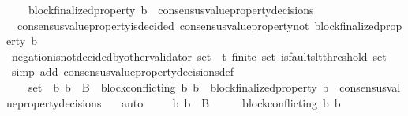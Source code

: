 \begin{isabellebody}
\ \ \ \ {\isachardoublequoteopen}block{\isacharunderscore}finalized{\isacharunderscore}property\ b{}\ {\isasymin}\ consensus{\isacharunderscore}value{\isacharunderscore}property{\isacharunderscore}decisions\ {\isasymsigma}{\isacharprime}{\isachardoublequoteclose}\ \isanewline
\ \ \ \isamarkupfalse%
\ {\isachardoublequoteopen}{\isasymnot}\ consensus{\isacharunderscore}value{\isacharunderscore}property{\isacharunderscore}is{\isacharunderscore}decided\ {\isacharparenleft}consensus{\isacharunderscore}value{\isacharunderscore}property{\isacharunderscore}not\ {\isacharparenleft}block{\isacharunderscore}finalized{\isacharunderscore}property\ b{}{\isacharparenright}{\isacharcomma}\ {\isasymsigma}{\isacharprime}{\isacharparenright}{\isachardoublequoteclose}\isanewline
\ \ \ \ \ \ \isamarkupfalse%
\ negation{\isacharunderscore}is{\isacharunderscore}not{\isacharunderscore}decided{\isacharunderscore}by{\isacharunderscore}other{\isacharunderscore}validator\ {\isacartoucheopen}{\isasymsigma}{\isacharunderscore}set\ {\isasymsubseteq}\ {\isasymSigma}t{\isacartoucheclose}\ {\isacartoucheopen}finite\ {\isasymsigma}{\isacharunderscore}set{\isacartoucheclose}\ {\isacartoucheopen}is{\isacharunderscore}faults{\isacharunderscore}lt{\isacharunderscore}threshold\ {\isacharparenleft}{\isasymUnion}{\isasymsigma}{\isacharunderscore}set{\isacharparenright}{\isacartoucheclose}\ \isamarkupfalse%
\ {\isacharparenleft}simp\ add{\isacharcolon}\ consensus{\isacharunderscore}value{\isacharunderscore}property{\isacharunderscore}decisions{\isacharunderscore}def{\isacharparenright}\ \isanewline
\ \ \ \ \ \ \isamarkupfalse%
\ {\isacartoucheopen}{\isacharbraceleft}{\isasymsigma}{\isacharcomma}\ {\isasymsigma}{\isacharprime}{\isacharbraceright}\ {\isasymsubseteq}\ {\isasymsigma}{\isacharunderscore}set\ {\isasymand}\ {\isacharbraceleft}b{}{\isacharcomma}\ b{}{\isacharbraceright}\ {\isasymsubseteq}\ B\ {\isasymand}\ block{\isacharunderscore}conflicting\ {\isacharparenleft}b{}{\isacharcomma}\ b{}{\isacharparenright}\ {\isasymand}\ block{\isacharunderscore}finalized{\isacharunderscore}property\ b{}\ {\isasymin}\ consensus{\isacharunderscore}value{\isacharunderscore}property{\isacharunderscore}decisions\ {\isasymsigma}{\isacartoucheclose}\ \isamarkupfalse%
\ auto\isanewline
\ \ \ \isamarkupfalse%
\ {\isachardoublequoteopen}{\isacharbraceleft}b{}{\isacharcomma}\ b{}{\isacharbraceright}\ {\isasymsubseteq}\ B\ {\isasymand}\ {\isasymsigma}\ {\isasymin}\ {\isasymSigma}\ {\isasymand}\ block{\isacharunderscore}conflicting\ {\isacharparenleft}b{}{\isacharcomma}\ b{}{\isacharparenright}{\isachardoublequoteclose}\isanewline

\end{isabellebody}

